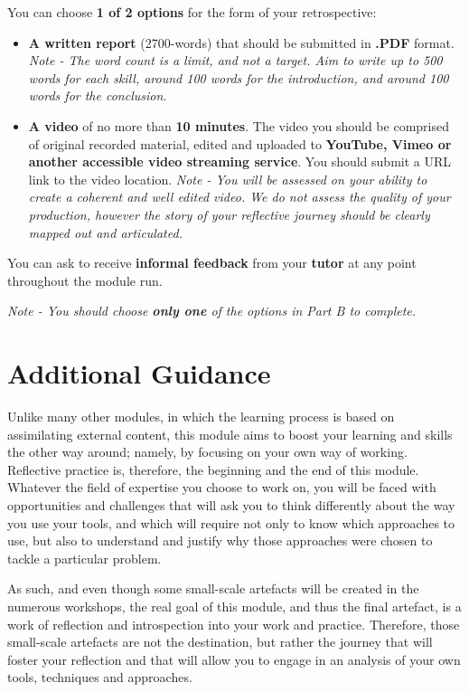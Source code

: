\documentclass{../../fal_assignment}
\begin{document}
You can choose \textbf{1 of 2 options} for the form of your retrospective:

\begin{itemize}
\item \textbf{A written report} (2700-words) that should be submitted in \textbf{.PDF} format. \emph{Note - The word count is a limit, and not a target. Aim to write up to 500 words for each skill, around 100 words for the introduction, and around 100 words for the conclusion.}
\item \textbf{A video} of no more than \textbf{10 minutes}. The video you should be comprised of original recorded material, edited and uploaded to \textbf{YouTube, Vimeo or another accessible video streaming service}. You should submit a URL link to the video location. \emph{Note - You will be assessed on your ability to create a coherent and well edited video. We do not assess the quality of your production, however the story of your reflective journey should be clearly mapped out and articulated.}
\end{itemize}
You can ask to receive \textbf{informal feedback} from your \textbf{tutor} at any point throughout the module run.

\emph{Note - You should choose \textbf{only one} of the options in Part B to complete.}


\section*{Additional Guidance}

Unlike many other modules, in which the learning process is based on assimilating external content, this module aims to boost your learning and skills the other way around; namely, by focusing on your own way of working. Reflective practice is, therefore, the beginning and the end of this module. Whatever the field of expertise you choose to work on, you will be faced with opportunities and challenges that will ask you to think differently about the way you use your tools, and which will require not only to know which approaches to use, but also to understand and justify why those approaches were chosen to tackle a particular problem.

As such, and even though some small-scale artefacts will be created in the numerous workshops, the real goal of this module, and thus the final artefact, is a work of reflection and introspection into your work and practice. Therefore, those small-scale artefacts are not the destination, but rather the journey that will foster your reflection and that will allow you to engage in an analysis of your own tools, techniques and approaches.
\end{document}
